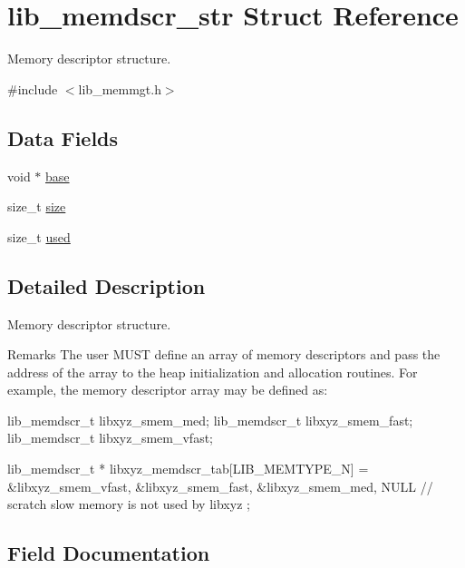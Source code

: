 \hypertarget{structlib__memdscr__str}{}\section{lib\+\_\+memdscr\+\_\+str Struct Reference}
\label{structlib__memdscr__str}


Memory descriptor structure.  




{\ttfamily \#include $<$lib\+\_\+memmgt.\+h$>$}

\subsection*{Data Fields}
\begin{DoxyCompactItemize}
\item 
void $\ast$ \hyperlink{structlib__memdscr__str_a95021f2dac50fa28470ebcd4c9c8b14c}{base}
\item 
size\+\_\+t \hyperlink{structlib__memdscr__str_a34437a2f1655d8adaedb8b6f99baf5d1}{size}
\item 
size\+\_\+t \hyperlink{structlib__memdscr__str_adf173931ba35fc1b2fa93b8911e2ca09}{used}
\end{DoxyCompactItemize}


\subsection{Detailed Description}
Memory descriptor structure. 

\begin{DoxyRemark}{Remarks}
The user M\+U\+S\+T define an array of memory descriptors and pass the address of the array to the heap initialization and allocation routines. For example, the memory descriptor array may be defined as\+: \begin{DoxyVerb}    lib_memdscr_t libxyz_smem_med;
    lib_memdscr_t libxyz_smem_fast;
    lib_memdscr_t libxyz_smem_vfast;
    
    lib_memdscr_t * libxyz_memdscr_tab[LIB_MEMTYPE_N] = {
      &libxyz_smem_vfast,
      &libxyz_smem_fast,
      &libxyz_smem_med,
      NULL                // scratch slow memory is not used by libxyz 
    };\end{DoxyVerb}
 
\end{DoxyRemark}


\subsection{Field Documentation}
\hypertarget{structlib__memdscr__str_a95021f2dac50fa28470ebcd4c9c8b14c}{}
